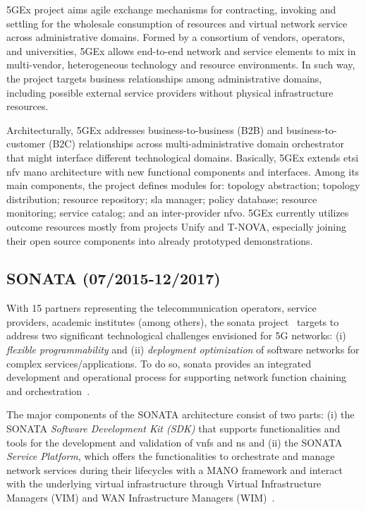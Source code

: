 5GEx project aims agile exchange mechanisms for contracting, invoking and settling for the wholesale consumption of resources and virtual network service across administrative domains. 
Formed by a consortium of vendors, operators, and universities, 5GEx allows end-to-end network and service elements to mix in multi-vendor, heterogeneous technology and resource environments.
In such way, the project targets business relationships among administrative domains, including possible external service providers without physical infrastructure resources.

Architecturally, 5GEx addresses business-to-business (B2B) and business-to-customer (B2C) relationships across multi-administrative domain orchestrator that might interface different technological domains. 
Basically, 5GEx extends \gls{etsi} \gls{nfv} \gls{mano} architecture with new functional components and interfaces.
Among its main components, the project defines modules for: topology abstraction; topology distribution; resource repository; \gls{sla} manager; policy database; resource monitoring; service catalog; and an inter-provider \gls{nfvo}.
5GEx currently utilizes outcome resources mostly from projects Unify and T-NOVA, especially joining their open source components into already prototyped demonstrations. 

\subsection{SONATA (07/2015-12/2017)}

With 15 partners representing the telecommunication operators, service providers, academic institutes (among others), the \acrfull{sonata} project~\cite{sonata} targets to address two significant technological challenges envisioned for 5G networks: (i) \textit{flexible programmability} and (ii) \textit{deployment optimization} of software networks for complex services/applications. To do so, \acrshort{sonata} provides an integrated development and operational process for supporting network function chaining and orchestration~\cite{karl2016devops}. 

The major components of the SONATA architecture consist of two parts: (i) the SONATA \textit{Software Development Kit (SDK)} that supports functionalities and tools for the development and validation of \glspl{vnf} and \gls{ns} and (ii) the SONATA \textit{Service Platform}, which offers the functionalities to orchestrate and manage network services during their lifecycles with a MANO framework and interact with the underlying virtual infrastructure through Virtual Infrastructure Managers (VIM) and WAN Infrastructure Managers (WIM)~\cite{Draxler2017SONATA:Networksb}.

